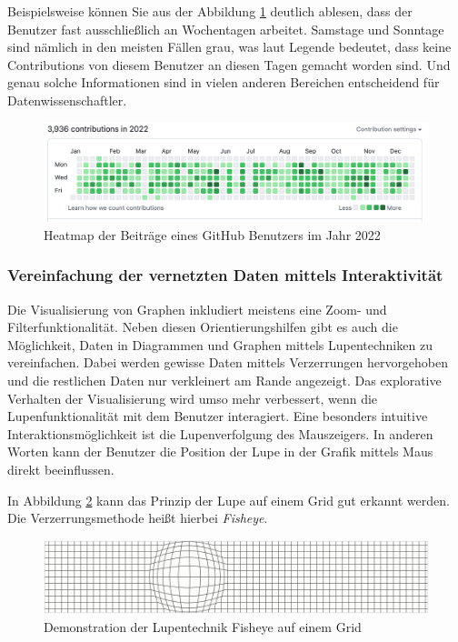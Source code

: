Beispielsweise können Sie aus der Abbildung \ref{fig:HeatmapGitHub} deutlich ablesen, dass der Benutzer fast ausschließlich an Wochentagen arbeitet. Samstage und Sonntage sind nämlich in den meisten Fällen grau, was laut Legende bedeutet, dass keine Contributions von diesem Benutzer an diesen Tagen gemacht worden sind. Und genau solche Informationen sind in vielen anderen Bereichen entscheidend für Datenwissenschaftler.

\begin{figure}
    \centering
    \includegraphics[width=1\textwidth]{content/img/Research/Visualisation/heatmap.png}
    \caption{Heatmap der Beiträge eines GitHub Benutzers im Jahr 2022 \cite{yiheatmap}}
    \label{fig:HeatmapGitHub}
\end{figure}
\FloatBarrier

\subsubsection{Vereinfachung der vernetzten Daten mittels Interaktivität}

Die Visualisierung von Graphen inkludiert meistens eine Zoom- und Filterfunktionalität. Neben diesen Orientierungshilfen gibt es auch die Möglichkeit, Daten in Diagrammen und Graphen mittels Lupentechniken zu vereinfachen. Dabei werden gewisse Daten mittels Verzerrungen hervorgehoben und die restlichen Daten nur verkleinert am Rande angezeigt. Das explorative Verhalten der Visualisierung wird umso mehr verbessert, wenn die Lupenfunktionalität mit dem Benutzer interagiert. Eine besonders intuitive Interaktionsmöglichkeit ist die Lupenverfolgung des Mauszeigers. In anderen Worten kann der Benutzer die Position der Lupe in der Grafik mittels Maus direkt beeinflussen. \cite{bostock2012fisheye}

In Abbildung \ref{fig:LupentechnikGridFisheye} kann das Prinzip der Lupe auf einem Grid gut erkannt werden. Die Verzerrungsmethode heißt hierbei \emph{Fisheye}.

\begin{figure}
    \centering
    \includegraphics[width=1\textwidth]{content/img/Research/Visualisation/distortion_fisheye.png}
    \caption{Demonstration der Lupentechnik Fisheye auf einem Grid \cite{bostock2012fisheye}}
    \label{fig:LupentechnikGridFisheye}
\end{figure}
\FloatBarrier

